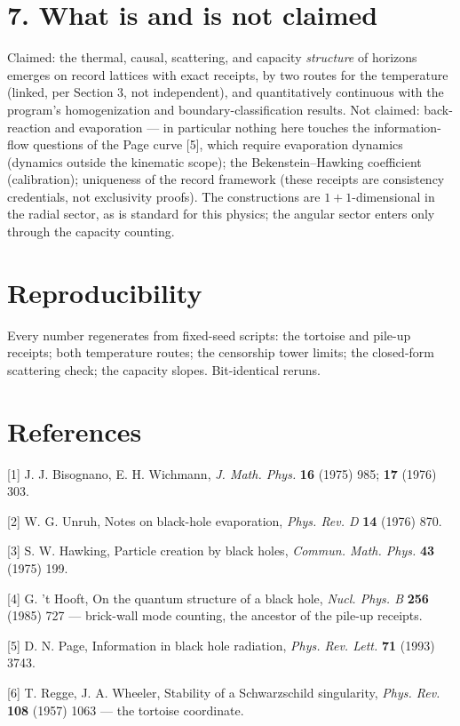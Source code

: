 \documentclass[11pt]{article}
\begin{document}
\section*{7. What is and is not claimed}
Claimed: the thermal, causal, scattering, and capacity \emph{structure} of horizons emerges on record lattices with exact receipts, by two routes for the temperature (linked, per Section 3, not independent), and quantitatively continuous with the program's homogenization and boundary-classification results.  Not claimed: back-reaction and evaporation — in particular nothing here touches the information-flow questions of the Page curve [5], which require evaporation dynamics (dynamics outside the kinematic scope); the Bekenstein–Hawking coefficient (calibration); uniqueness of the record framework (these receipts are consistency credentials, not exclusivity proofs).  The constructions are $1{+}1$-dimensional in the radial sector, as is standard for this physics; the angular sector enters only through the capacity counting.

\section*{Reproducibility}
Every number regenerates from fixed-seed scripts: the tortoise and pile-up receipts; both temperature routes; the censorship tower limits; the closed-form scattering check; the capacity slopes. Bit-identical reruns.

\section*{References}
[1] J. J. Bisognano, E. H. Wichmann, \emph{J. Math. Phys.} \textbf{16} (1975) 985; \textbf{17} (1976) 303.

[2] W. G. Unruh, Notes on black-hole evaporation, \emph{Phys. Rev. D} \textbf{14} (1976) 870.

[3] S. W. Hawking, Particle creation by black holes, \emph{Commun. Math. Phys.} \textbf{43} (1975) 199.

[4] G. 't Hooft, On the quantum structure of a black hole, \emph{Nucl. Phys. B} \textbf{256} (1985) 727 — brick-wall mode counting, the ancestor of the pile-up receipts.

[5] D. N. Page, Information in black hole radiation, \emph{Phys. Rev. Lett.} \textbf{71} (1993) 3743.

[6] T. Regge, J. A. Wheeler, Stability of a Schwarzschild singularity, \emph{Phys. Rev.} \textbf{108} (1957) 1063 — the tortoise coordinate.
\end{document}
